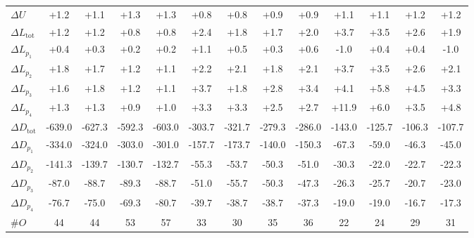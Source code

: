 \begin{tabular}{l c c c c c c c c c c c c}
\midrule
$\Delta U$ & +1.2 & +1.1 & +1.3 & +1.3 & +0.8 & +0.8 & +0.9 & +0.9 & +1.1 & +1.1 & +1.2 & +1.2 \\
$\Delta L_{\mathrm{tot}}$ & +1.2 & +1.2 & +0.8 & +0.8 & +2.4 & +1.8 & +1.7 & +2.0 & +3.7 & +3.5 & +2.6 & +1.9 \\
$\Delta L_{p_1}$ & +0.4 & +0.3 & +0.2 & +0.2 & +1.1 & +0.5 & +0.3 & +0.6 & -1.0 & +0.4 & +0.4 & -1.0 \\
$\Delta L_{p_2}$ & +1.8 & +1.7 & +1.2 & +1.1 & +2.2 & +2.1 & +1.8 & +2.1 & +3.7 & +3.5 & +2.6 & +2.1 \\
$\Delta L_{p_3}$ & +1.6 & +1.8 & +1.2 & +1.1 & +3.7 & +1.8 & +2.8 & +3.4 & +4.1 & +5.8 & +4.5 & +3.3 \\
$\Delta L_{p_4}$ & +1.3 & +1.3 & +0.9 & +1.0 & +3.3 & +3.3 & +2.5 & +2.7 & +11.9 & +6.0 & +3.5 & +4.8 \\
$\Delta D_{\mathrm{tot}}$ & -639.0 & -627.3 & -592.3 & -603.0 & -303.7 & -321.7 & -279.3 & -286.0 & -143.0 & -125.7 & -106.3 & -107.7 \\
$\Delta D_{p_1}$ & -334.0 & -324.0 & -303.0 & -301.0 & -157.7 & -173.7 & -140.0 & -150.3 & -67.3 & -59.0 & -46.3 & -45.0 \\
$\Delta D_{p_2}$ & -141.3 & -139.7 & -130.7 & -132.7 & -55.3 & -53.7 & -50.3 & -51.0 & -30.3 & -22.0 & -22.7 & -22.3 \\
$\Delta D_{p_3}$ & -87.0 & -88.7 & -89.3 & -88.7 & -51.0 & -55.7 & -50.3 & -47.3 & -26.3 & -25.7 & -20.7 & -23.0 \\
$\Delta D_{p_4}$ & -76.7 & -75.0 & -69.3 & -80.7 & -39.7 & -38.7 & -38.7 & -37.3 & -19.0 & -19.0 & -16.7 & -17.3 \\
$\#O$ & 44 & 44 & 53 & 57 & 33 & 30 & 35 & 36 & 22 & 24 & 29 & 31 \\
\bottomrule
\end{tabular}
